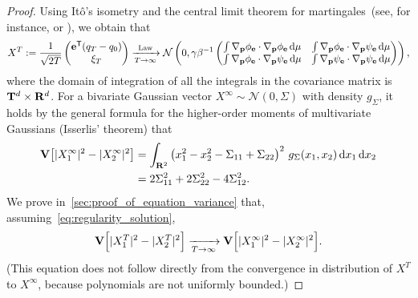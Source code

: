 \documentclass[11pt,a4paper]{article}
\begin{document}
\begin{proof}
    Using It\^o's isometry and the central limit theorem for martingales~(see, for instance, \cite{MR668684} or \cite[Theorem 3.3]{pavliotis2008multiscale}),
    we obtain that
    \[
        X^T :=
        \frac{1}{\sqrt{2T}}
        \begin{pmatrix}
            \boldsymbol{\mathbf e}^\mathsf T (q_T - q_0) \\
            \xi_T
        \end{pmatrix}
        \xrightarrow[T \to \infty]{\rm Law}
        \mathcal N \left(0,
            \gamma \beta^{-1}
            \begin{pmatrix}
                \int \nabla_{\boldsymbol{\mathbf p}} \phi_{\boldsymbol{\mathbf e}} \cdot \nabla_{\boldsymbol{\mathbf p}} \phi_{\boldsymbol{\mathbf e}} \, \mathrm d \mu & \int \nabla_{\boldsymbol{\mathbf p}} \phi_{\boldsymbol{\mathbf e}} \cdot \nabla_{\boldsymbol{\mathbf p}} \psi_{\boldsymbol{\mathbf e}} \, \mathrm d \mu \\
                \int \nabla_{\boldsymbol{\mathbf p}} \phi_{\boldsymbol{\mathbf e}} \cdot \nabla_{\boldsymbol{\mathbf p}} \psi_{\boldsymbol{\mathbf e}} \, \mathrm d \mu & \int \nabla_{\boldsymbol{\mathbf p}} \psi_{\boldsymbol{\mathbf e}} \cdot \nabla_{\boldsymbol{\mathbf p}} \psi_{\boldsymbol{\mathbf e}} \, \mathrm d \mu
            \end{pmatrix}
        \right),
    \]
    where the domain of integration of all the integrals in the covariance matrix is $\mathbf T^d \times \mathbf R^d$.
    For a bivariate Gaussian vector $X^{\infty} \sim \mathcal N(0, \Sigma)$ with density $g_{\Sigma}$,
    it holds by the general formula for the higher-order moments of multivariate Gaussians (Isserlis' theorem)
    that
    \begin{align}
        \notag
        \mathbf{V} \bigl[ \lvert X^{\infty}_1 \rvert^2 - \lvert X^{\infty}_2 \rvert^2\bigr]
        &= \int_{\mathbf R^2} \left( x_1^2 - x_2^2 - \Sigma_{11} + \Sigma_{22} \right)^2 \, g_{\Sigma}(x_1, x_2) \, \mathrm d x_1 \, \mathrm d x_2 \\
        \label{eq:intermediate_identity}
        &= 2 \Sigma_{11}^2 + 2 \Sigma_{22}^2 - 4 \Sigma_{12}^2.
    \end{align}
    We prove in~\cref{sec:proof_of_equation_variance} that,
    assuming~\eqref{eq:regularity_solution},
    \begin{equation}
        \label{eq:limit_variance}
        \mathbf{V} \Bigl[ \lvert X^T_1 \rvert^2 - \lvert X^T_2 \rvert^2 \Bigr]
        \xrightarrow[T \to \infty]{}
        \mathbf{V} \Bigl[ \lvert X^{\infty}_1 \rvert^2 - \lvert X^{\infty}_2 \rvert^2 \Bigr].
    \end{equation}
    (This equation does not follow directly from the convergence in distribution of $X^T$ to $X^{\infty}$,
    because polynomials are not uniformly bounded.)

\end{proof}
\end{document}
